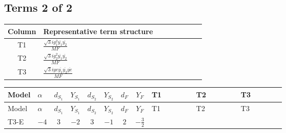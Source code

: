 \documentclass[8pt]{article}
\begin{document}
\begin{landscape}
\subsection*{Terms 2 of 2}
\begin{center}
\begin{tabular}{@{}c >{\raggedright\arraybackslash}p{0.82\linewidth}@{}}
\toprule
Column & Representative term structure \\
\midrule
T1 & \(\displaystyle \frac{\sqrt{3} i g_{1}^{2} \overline{y_{1}} \overline{y_{2}}}{MF}\) \\
\midrule
T2 & \(\displaystyle \frac{\sqrt{3} i g_{2}^{2} \overline{y_{1}} \overline{y_{2}}}{MF}\) \\
\midrule
T3 & \(\displaystyle \frac{\sqrt{3} i ye \overline{y_{1}} \overline{y_{2}} \overline{ye}}{MF}\) \\
\midrule
\bottomrule
\end{tabular}
\end{center}
\smallskip
\tiny
\begin{longtable}{@{}llcccccc >{\raggedright\arraybackslash}p{0.21\linewidth} >{\raggedright\arraybackslash}p{0.21\linewidth} >{\raggedright\arraybackslash}p{0.21\linewidth}@{}}
\toprule
Model & $\alpha$ & $d_{S_1}$ & $Y_{S_1}$ & $d_{S_2}$ & $Y_{S_2}$ & $d_F$ & $Y_F$ & T1 & T2 & T3 \\
\midrule
\endfirsthead
\toprule
Model & $\alpha$ & $d_{S_1}$ & $Y_{S_1}$ & $d_{S_2}$ & $Y_{S_2}$ & $d_F$ & $Y_F$ & T1 & T2 & T3 \\
\midrule
\endhead
T3-E & $-4$ & $3$ & $-2$ & $3$ & $-1$ & $2$ & $-\frac{3}{2}$ & \scriptsize\adjustbox{max width=\linewidth}{$\begin{gathered} \frac{9 \sqrt{3} i g_{1}^{2} \overline{y_{1}} \overline{y_{2}}}{8 MF}\end{gathered}$} & \scriptsize\adjustbox{max width=\linewidth}{$\begin{gathered} \frac{11 \sqrt{3} i g_{2}^{2} \overline{y_{1}} \overline{y_{2}}}{8 MF}\end{gathered}$} & \scriptsize\adjustbox{max width=\linewidth}{$\begin{gathered} - \frac{\sqrt{3} i ye \overline{y_{1}} \overline{y_{2}} \overline{ye}}{12 MF}\end{gathered}$} \\
\midrule
\bottomrule
\end{longtable}
\end{landscape}
\end{document}
